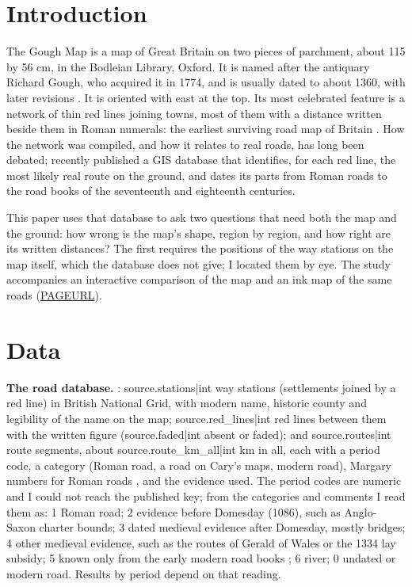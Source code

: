 \documentclass[11pt,a4paper]{article}
\begin{document}
\section{Introduction}
The Gough Map is a map of Great Britain on two pieces of parchment, about 115 by 56 cm, in the Bodleian Library, Oxford. It is named after the antiquary Richard Gough, who acquired it in 1774, and is usually dated to about 1360, with later revisions \citep{parsons,delano}. It is oriented with east at the top. Its most celebrated feature is a network of thin red lines joining towns, most of them with a distance written beside them in Roman numerals: the earliest surviving road map of Britain \citep{lilley,delano}. How the network was compiled, and how it relates to real roads, has long been debated; \citet{ads} recently published a GIS database that identifies, for each red line, the most likely real route on the ground, and dates its parts from Roman roads to the road books of the seventeenth and eighteenth centuries.

This paper uses that database to ask two questions that need both the map and the ground: how wrong is the map's shape, region by region, and how right are its written distances? The first requires the positions of the way stations on the map itself, which the database does not give; I located them by eye. The study accompanies an interactive comparison of the map and an ink map of the same roads (\url{PAGEURL}).

\section{Data}
\textbf{The road database.} \citet{ads}: {{source.stations|int}} way stations (settlements joined by a red line) in British National Grid, with modern name, historic county and legibility of the name on the map; {{source.red_lines|int}} red lines between them with the written figure ({{source.faded|int}} absent or faded); and {{source.routes|int}} route segments, about {{source.route_km_all|int}} km in all, each with a period code, a category (Roman road, a road on Cary's maps, modern road), Margary numbers for Roman roads \citep{margary}, and the evidence used. The period codes are numeric and I could not reach the published key; from the categories and comments I read them as: 1 Roman road; 2 evidence before Domesday (1086), such as Anglo-Saxon charter bounds; 3 dated medieval evidence after Domesday, mostly bridges; 4 other medieval evidence, such as the routes of Gerald of Wales or the 1334 lay subsidy; 5 known only from the early modern road books \citep{ogilby}; 6 river; 0 undated or modern road. Results by period depend on that reading.
\end{document}

